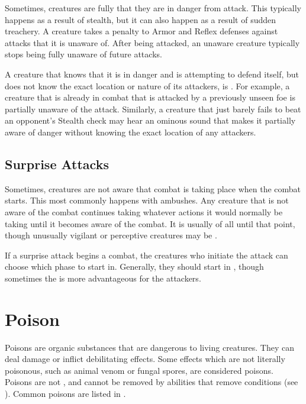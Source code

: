     Sometimes, creatures are fully \unaware that they are in danger from attack.
    This typically happens as a result of stealth, but it can also happen as a result of sudden treachery.
    A creature takes a  penalty to Armor and Reflex defenses against attacks that it is unaware of.
    After being attacked, an unaware creature typically stops being fully unaware of future attacks.

    A creature that knows that it is in danger and is attempting to defend itself, but does not know the exact location or nature of its attackers, is \partiallyunaware.
    For example, a creature that is already in combat that is attacked by a previously unseen foe is partially unaware of the attack.
    Similarly, a creature that just barely fails to beat an opponent's Stealth check may hear an ominous sound that makes it partially aware of danger without knowing the exact location of any attackers.

    \subsection{Surprise Attacks}\label{Surprise Attacks}
        Sometimes, creatures are not aware that combat is taking place when the combat starts.
        This most commonly happens with ambushes.
        Any creature that is not aware of the combat continues taking whatever actions it would normally be taking until it becomes aware of the combat.
        It is usually \unaware of all until that point, though unusually vigilant or perceptive creatures may be \partiallyunaware.

        If a surprise attack begins a combat, the creatures who initiate the attack can choose which phase to start in.
        Generally, they should start in , though sometimes the  is more advantageous for the attackers.

\section{Poison}\label{Poison}
    Poisons are organic substances that are dangerous to living creatures.
    They can deal damage or inflict debilitating effects.
    Some effects which are not literally poisonous, such as animal venom or fungal spores, are considered poisons.
    Poisons are not , and cannot be removed by abilities that remove conditions (see ).
    Common poisons are listed in .

